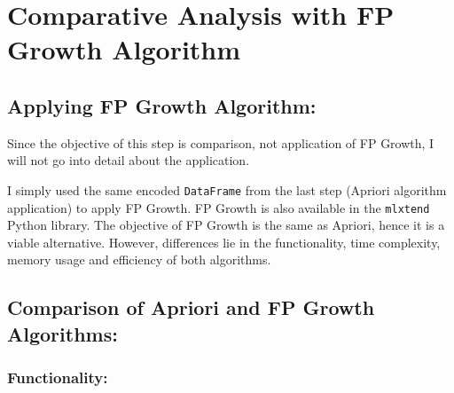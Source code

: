 
\chapter{Comparative Analysis with FP Growth Algorithm} %

\label{Chapter1} %



\section{Applying FP Growth Algorithm: }

Since the objective of this step is comparison, not application of FP Growth, I will not go into detail about the application. 

I simply used the same encoded  \verb|DataFrame| from the last step (Apriori algorithm application) to apply FP Growth. FP Growth is also available in the \verb|mlxtend| Python library. The objective of FP Growth is the same as Apriori, hence it is a viable alternative. However, differences lie in the functionality, time complexity, memory usage and efficiency of both algorithms.

\newpage
\section{Comparison of Apriori and FP Growth Algorithms:}

\subsection{Functionality:}

